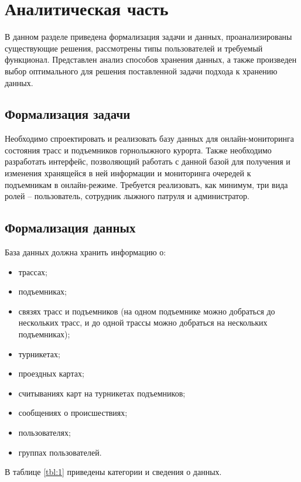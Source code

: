 \chapter{Аналитическая часть}

В данном разделе приведена формализация задачи и данных, проанализированы существующие решения, рассмотрены типы пользователей и требуемый функционал. Представлен анализ способов хранения данных, а также произведен выбор оптимального для решения поставленной задачи подхода к хранению данных. 

\section{Формализация задачи}

Необходимо спроектировать и реализовать базу данных для онлайн-мониторинга состояния трасс и подъемников горнолыжного курорта. Также необходимо разработать интерфейс, позволяющий работать с данной базой для получения и изменения хранящейся в ней информации и мониторинга очередей к подъемникам в онлайн-режиме. Требуется реализовать, как минимум, три вида ролей – пользователь, сотрудник лыжного патруля и администратор.

\section{Формализация данных}\label{data}

База данных должна хранить информацию о:
\begin{itemize}
	\item трассах;
	\item подъемниках;
	\item связях трасс и подъемников (на одном подъемнике можно добраться до нескольких трасс, и до одной трассы можно добраться на нескольких подъемниках);
	\item турникетах;
	\item проездных картах;
	\item считываниях карт на турникетах подъемников;
	\item сообщениях о происшествиях;
	\item пользователях;
	\item группах пользователей.
\end{itemize}

В таблице \ref{tbl:1} приведены категории и сведения о данных.

